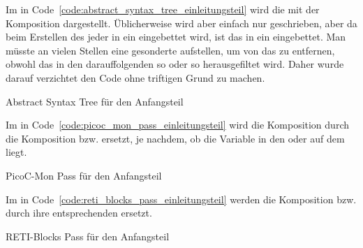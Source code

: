 Im  in Code~\ref{code:abstract_syntax_tree_einleitungsteil} wird die   mit der Komposition  dargestellt. Üblicherweise wird aber einfach nur  geschrieben, aber da beim Erstellen des  jeder  in ein  eingebettet wird, ist das  in ein  eingebettet. Man müsste an vielen Stellen eine gesonderte  aufstellen, um von  das  zu entfernen, obwohl das  in den darauffolgenden  so oder so herausgefiltet wird. Daher wurde darauf verzichtet den Code ohne triftigen Grund  zu machen.

\begin{code}
  \centering
  \caption{Abstract Syntax Tree für den Anfangsteil}
  \label{code:abstract_syntax_tree_einleitungsteil}
\end{code}

Im  in Code~\ref{code:picoc_mon_pass_einleitungsteil} wird die Komposition  durch die Komposition  bzw.  ersetzt, je nachdem, ob die Variable  in den  oder auf dem  liegt.

\begin{code}
  \centering
  \caption{PicoC-Mon Pass für den Anfangsteil}
  \label{code:picoc_mon_pass_einleitungsteil}
\end{code}

Im  in Code~\ref{code:reti_blocks_pass_einleitungsteil} werden die Komposition  bzw.  durch ihre entsprechenden  ersetzt.

\begin{code}
  \centering
  \caption{RETI-Blocks Pass für den Anfangsteil}
  \label{code:reti_blocks_pass_einleitungsteil}
\end{code}

